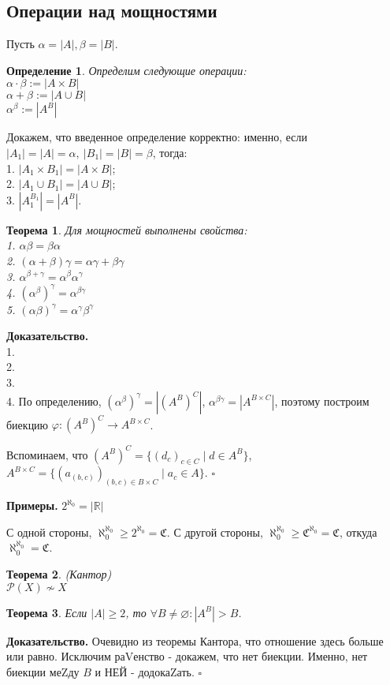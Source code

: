 \documentclass[a4paper]{article}
\newtheorem{defin}{Определение}
\newtheorem{theor}{Теорема}
\begin{document}
\subsection{Операции над мощностями}
Пусть $\alpha=|A|,\beta = |B|$.
\begin{defin} Определим следующие операции:\\
 $\alpha\cdot \beta:=|A\times B|$\\
 $\alpha+\beta:=|A\cup B|$\\
 $\alpha^\beta:=|A^B|$
\end{defin}
Докажем, что введенное определение корректно: именно, если
$|A_1|=|A|=\alpha,~|B_1|=|B|=\beta$, тогда:\\
1.  $|A_1\times B_1|=|A\times B|$;\\
2. $|A_1\cup B_1|=|A\cup B|$;\\
3. $|A_1^{B_1}|=|A^B|$.\\
\begin{theor}
Для мощностей выполнены свойства:\\
1. $\alpha \beta = \beta\alpha$\\
2. $(\alpha+\beta)\gamma = \alpha\gamma+\beta\gamma$\\
3. $\alpha^{\beta+\gamma} = \alpha^\beta\alpha^\gamma$\\
4. $(\alpha^\beta)^\gamma = \alpha^{\beta\gamma}$\\
5. $(\alpha\beta)^\gamma = \alpha^\gamma\beta^\gamma$
\end{theor}
\textbf{Доказательство.}\\
1. \\
2. \\
3. \\
4. По определению, $(\alpha^\beta)^\gamma = |(A^B)^C|$,
$\alpha^{\beta\gamma} = |A^{B\times C}|$, поэтому построим биекцию
$\varphi\colon (A^B)^C\to A^{B\times C}$. 

Вспоминаем, что $(A^B)^C = \{(d_c)_{c\in C}\mid d\in A^B\}$, 
$A^{B\times C} = \{(a_{(b,c)})_{(b,c)\in B\times C}\mid 
a_c\in A\}$. $\square$ \\

\textbf{Примеры.} 
$2^{\aleph_0}=|\mathbb{R}|$

С одной стороны, $\aleph_0^{\aleph_0}\geqslant 2^{\aleph_0} = \mathfrak C$. 
С другой стороны,
$\aleph_0^{\aleph_0}\geqslant \mathfrak C^{\aleph_0}=\mathfrak C$, откуда
$\aleph_0^{\aleph_0} = \mathfrak C$. 

\begin{theor}
    (Кантор)\\
    $\mathcal{P}(X)\not\sim X$
\end{theor}
\begin{theor}
Если $|A|\geqslant 2$, то $\forall  B\ne \varnothing:|A^B|>B$.
\end{theor}
\textbf{Доказательство.} 
Очевидно из теоремы Кантора, что отношение здесь больше или равно. Исключим
раVенство - докажем, что нет биекции. Именно, нет биекции меZду 
$B$ и  НЕЙ - додокаZать. $\square$ \\
\end{document}
